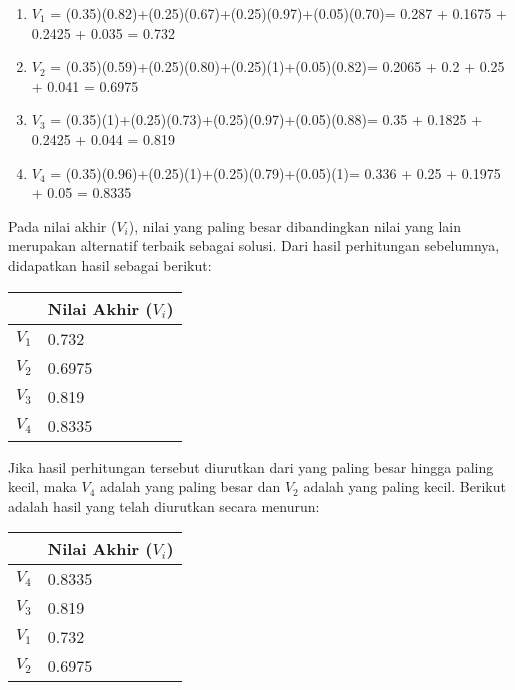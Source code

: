 \documentclass[a4paper,twoside]{article}
\begin{document}
\begin{enumerate}
\begin{enumerate}
	\item $V_{1}$ = (0.35)(0.82)+(0.25)(0.67)+(0.25)(0.97)+(0.05)(0.70)= 0.287 + 0.1675 + 0.2425 + 0.035 = 0.732
	\item $V_{2}$ = (0.35)(0.59)+(0.25)(0.80)+(0.25)(1)+(0.05)(0.82)= 0.2065 + 0.2 + 0.25 + 0.041 = 0.6975
	\item $V_{3}$ = (0.35)(1)+(0.25)(0.73)+(0.25)(0.97)+(0.05)(0.88)= 0.35 + 0.1825 + 0.2425 + 0.044 = 0.819
	\item $V_{4}$ = (0.35)(0.96)+(0.25)(1)+(0.25)(0.79)+(0.05)(1)= 0.336 + 0.25 + 0.1975 + 0.05 = 0.8335
\end{enumerate}

Pada nilai akhir ($V_{i}$), nilai yang paling besar dibandingkan nilai yang lain merupakan alternatif terbaik sebagai solusi. Dari hasil perhitungan sebelumnya, didapatkan hasil sebagai berikut:

\begin{center}
    \begin{tabular}{| l | l | }
    \hline
     & Nilai Akhir ($V_{i}$)  \\ \hline
   $V_{1}$ & 0.732 \\ \hline
   $V_{2}$ & 0.6975   \\ \hline
	 $V_{3}$ & 0.819  \\ \hline
   $V_{4}$ & 0.8335   \\ 
    \hline
    \end{tabular}
\end{center}

Jika hasil perhitungan tersebut diurutkan dari yang paling besar hingga paling kecil, maka $V_{4}$ adalah yang paling besar dan $V_{2}$ adalah yang paling kecil. Berikut adalah hasil yang telah diurutkan secara menurun:

\begin{center}
    \begin{tabular}{| l | l | }
    \hline
     & Nilai Akhir ($V_{i}$)  \\ \hline
  $V_{4}$ & 0.8335\\ \hline
	$V_{3}$ & 0.819\\ \hline
	$V_{1}$ & 0.732 \\ \hline
   $V_{2}$ & 0.6975  \\ 
    \hline
    \end{tabular}
\end{center}


\end{enumerate}
\end{document}
